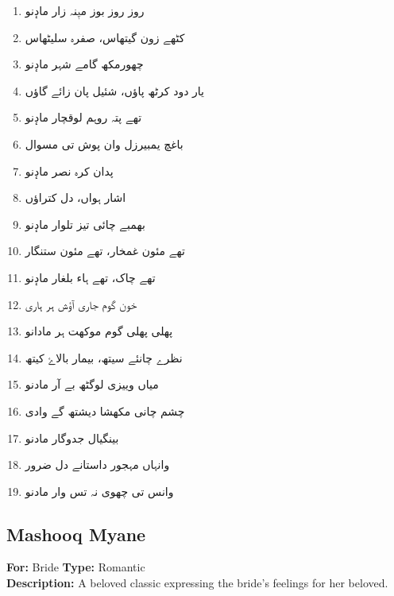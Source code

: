 \documentclass[12pt]{article}
\newcommand{\bigarabic}[1]{\fontsize{16pt}{18pt}\selectfont \textarabic{#1}}
\begin{document}
\begin{multicols}{2}
\columnbreak

\begin{RTL}
\begin{enumerate}[leftmargin=*, label=\arabic*., font=\fontsize{16pt}{18pt}\selectfont]
  \item \bigarabic{روز روز بوز میٖنہ زار مادٕنو}
  \item \bigarabic{کٹھے زون گیتھاس، صفرہ سلیٹھاس}
  \item \bigarabic{چھورمکھ گامے شہر مادٕنو}
  \item \bigarabic{یار دود کرٹھ پاؤں، شئیل پان زائے گاؤں}
  \item \bigarabic{تھے پتہ روہم لوقچار مادٕنو}
  \item \bigarabic{باغچ یمبیرزل وان پوش تی مسوال}
  \item \bigarabic{پدان کرہ نصر مادٕنو}
  \item \bigarabic{اشار ہواں، دل کتراؤں}
  \item \bigarabic{بھمبے چائی تیز تلوار مادٕنو}
  \item \bigarabic{تھے مئون غمخار، تھے مئون ستنگار}
  \item \bigarabic{تھے چاک، تھے ہاء بلغار مادٕنو}
  \item \bigarabic{خون گوم جاری آؤش ہر ہاری}
  \item \bigarabic{پھلی پھلی گوم موکھت ہر مادانو}
  \item \bigarabic{نظرے چانئے سیتھ، بیمار بالاۓ کیتھ}
  \item \bigarabic{میاں وییزی لوگٹھ بے آر مادنو}
  \item \bigarabic{چشم چانی مکھشا دیشتھ گے وادی}
  \item \bigarabic{بینگیال جدوگار مادنو}
  \item \bigarabic{وانہاں مہجور داستانے دل ضرور}
  \item \bigarabic{وانس تی چھوی نہ تس وار مادنو}
\end{enumerate}
\end{RTL}
\end{multicols}

\subsection*{Mashooq Myane}
\textbf{For:} Bride \quad \textbf{Type:} Romantic\\
\textbf{Description:} A beloved classic expressing the bride's feelings for her beloved.
\end{document}
